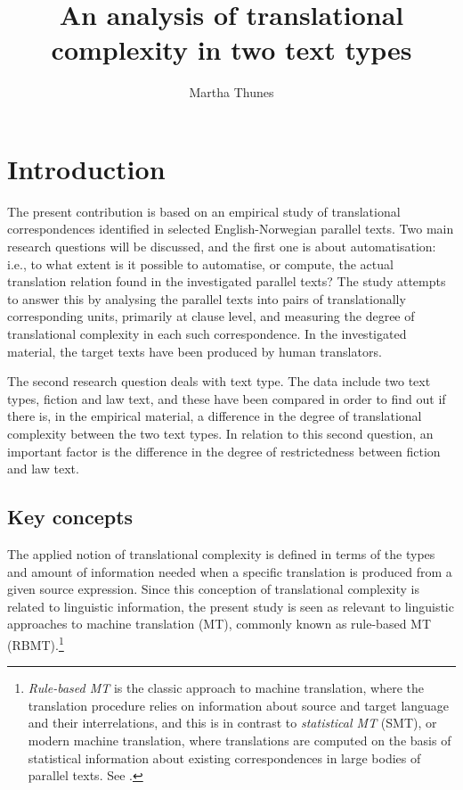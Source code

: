 \documentclass[output=paper]{LSP/langsci}
\author{Martha Thunes\affiliation{University of Bergen} 
}
\title{An analysis of translational complexity in two text types}
\begin{document}

\section{Introduction}\label{sec:thunes:1} 

The present contribution is based on an empirical study of translational correspondences identified in selected English-Norwegian parallel texts. Two main research questions will be discussed, and the first one is about automatisation: i.e., to what extent is it possible to automatise, or compute, the actual translation relation found in the investigated parallel texts? The study attempts to answer this by analysing the parallel texts into pairs of translationally corresponding units, primarily at clause level, and measuring the degree of translational complexity in each such correspondence. In the investigated material, the target texts have been produced by human translators.

The second research question deals with text type. The data include two text types, fiction and law text, and these have been compared in order to find out if there is, in the empirical material, a difference in the degree of translational complexity between the two text types. In relation to this second question, an important factor is the difference in the degree of restrictedness between fiction and law text. 

\subsection{Key concepts}\label{sec:thunes:1.1}

The applied notion of translational complexity is defined in terms of the types and amount of information needed when a specific translation is produced from a given source expression. Since this conception of translational complexity is related to linguistic information, the present study is seen as relevant to linguistic approaches to machine translation (MT), commonly known as rule-based MT (RBMT).\footnote{ \textit{Rule-based MT} is the classic approach to machine translation, where the translation procedure relies on information about source and target language and their interrelations, and this is in contrast to \textit{statistical MT} (SMT), or modern machine translation, where translations are computed on the basis of statistical information about existing correspondences in large bodies of parallel texts. See \citet[898]{Jurafsky2009}.} 
\end{document}
